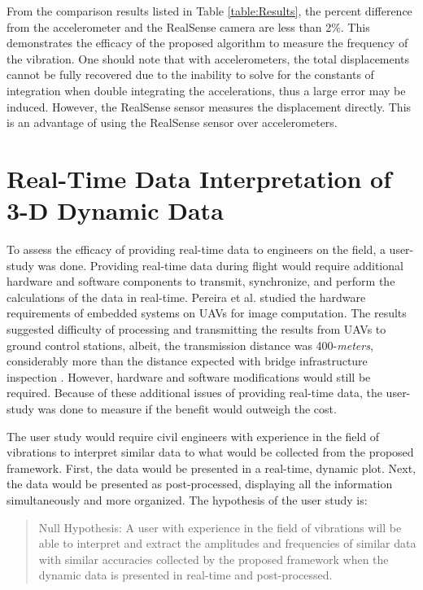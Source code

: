 \documentclass{sigchi}
\begin{document}
From the comparison results listed in Table \ref{table:Results}, the percent difference from the accelerometer and the RealSense camera are less than 2\%. This demonstrates the efficacy of the proposed algorithm to measure the frequency of the vibration. One should note that with accelerometers, the total displacements cannot be fully recovered due to the inability to solve for the constants of integration when double integrating the accelerations, thus a large error may be induced. However, the RealSense sensor measures the displacement directly. This is an advantage of using the RealSense sensor over accelerometers.

\section{Real-Time Data Interpretation of 3-D Dynamic Data}

To assess the efficacy of providing real-time data to engineers on the field, a user-study was done. Providing real-time data during flight would require additional hardware and software components to transmit, synchronize, and perform the calculations of the data in real-time. Pereira et al. studied the hardware requirements of embedded systems on UAVs for image computation. The results suggested difficulty of processing and transmitting the results from UAVs to ground control stations, albeit, the transmission distance was 400-\textit{meters}, considerably more than the distance expected with bridge infrastructure inspection \cite{Pereira2015}. However, hardware and software modifications would still be required. Because of these additional issues of providing real-time data, the user-study was done to measure if the benefit would outweigh the cost. 

The user study would require civil engineers with experience in the field of vibrations to interpret similar data to what would be collected from the proposed framework. First, the data would be presented in a real-time, dynamic plot. Next, the data would be presented as post-processed, displaying all the information simultaneously and more organized. The hypothesis of the user study is:

\begin{quote}
    Null Hypothesis: A user with experience in the field of vibrations will be able to interpret and extract the amplitudes and frequencies of similar data with similar accuracies collected by the proposed framework when the dynamic data is presented in real-time and post-processed.
\end{quote}
\end{document}
